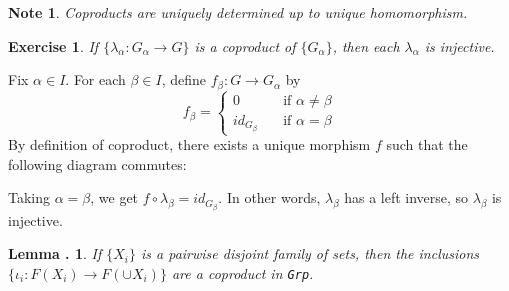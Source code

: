 \documentclass[twoside]{report}
\newcommand{\cat}[1]{\texttt{#1}}
\newcounter{Lecture}
\theoremstyle{myts}
\newcounter{c}[Lecture]
\newtheorem{lma}[c]{Lemma \arabic{Lecture}.}
\newtheorem*{nte}{Note}
\newcounter{ex}
\newtheorem{exc}[ex]{Exercise }
\newenvironment{prf}{
  \noindent\begin{mdframed}[style=prf]}{\end{mdframed} \vspace{1em}
}
\begin{document}
\begin{nte}
  Coproducts are uniquely determined up to unique homomorphism.
\end{nte}

\begin{exc}
  If \( \{ \lambda_\alpha : G_\alpha \to G \} \) is a coproduct of \( \{ G_\alpha \} \), then each \(\lambda_\alpha\) is injective.
\end{exc}

\begin{prf}
  Fix \(\alpha\in I \). For each \( \beta\in I \), define \( f_\beta : G \to G_\alpha \) by
  \[
    f_\beta = 
    \begin{cases}
      0 &\quad \textrm{if } \alpha \neq \beta \\
      id_{G_\beta} &\quad \textrm{if } \alpha = \beta
    \end{cases}
  \]
  By definition of coproduct, there exists a unique morphism $f$ such that the following diagram commutes:
  \begin{center}
  \end{center}
  Taking \( \alpha = \beta \), we get \( f \circ \lambda_\beta = id_{G_\beta} \). In other words, $\lambda_\beta$ has a left inverse, so $\lambda_\beta$ is injective.
\end{prf}

\begin{lma}
  If \(\{X_i\}\) is a pairwise disjoint family of sets, then the inclusions \( \{ \iota_i : F(X_i) \to F(\cup X_i) \} \) are a coproduct in \cat{Grp}. 
\end{lma}
\end{document}
